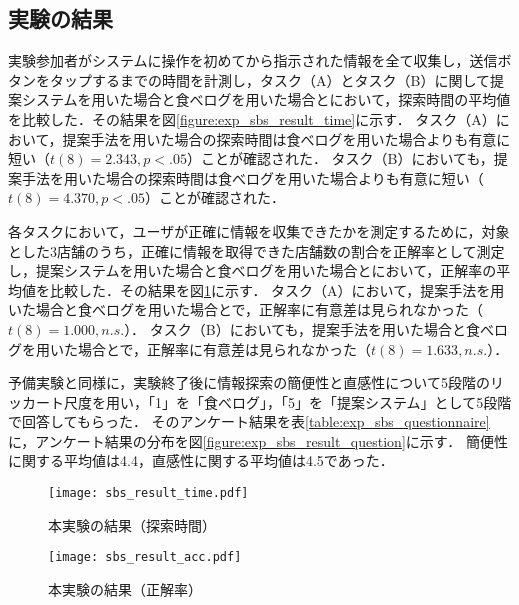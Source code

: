   \subsection{実験の結果}
    実験参加者がシステムに操作を初めてから指示された情報を全て収集し，送信ボタンをタップするまでの時間を計測し，タスク（A）とタスク（B）に関して提案システムを用いた場合と食べログを用いた場合とにおいて，探索時間の平均値を比較した．その結果を図\ref{figure:exp_sbs_result_time}に示す．
    タスク（A）において，提案手法を用いた場合の探索時間は食べログを用いた場合よりも有意に短い（$t(8)=2.343, p<.05$）ことが確認された．
    タスク（B）においても，提案手法を用いた場合の探索時間は食べログを用いた場合よりも有意に短い（$t(8)=4.370, p<.05$）ことが確認された．

    各タスクにおいて，ユーザが正確に情報を収集できたかを測定するために，対象とした3店舗のうち，正確に情報を取得できた店舗数の割合を正解率として測定し，提案システムを用いた場合と食べログを用いた場合とにおいて，正解率の平均値を比較した．その結果を図\ref{figure:exp_sbs_result_acc}に示す．
    タスク（A）において，提案手法を用いた場合と食べログを用いた場合とで，正解率に有意差は見られなかった（$t(8)=1.000, n.s.$）．
    タスク（B）においても，提案手法を用いた場合と食べログを用いた場合とで，正解率に有意差は見られなかった（$t(8)=1.633, n.s.$）．

    予備実験と同様に，実験終了後に情報探索の簡便性と直感性について5段階のリッカート尺度を用い，「1」を「食べログ」，「5」を「提案システム」として5段階で回答してもらった．
    そのアンケート結果を表\ref{table:exp_sbs_questionnaire}に，アンケート結果の分布を図\ref{figure:exp_sbs_result_question}に示す．
    簡便性に関する平均値は4.4，直感性に関する平均値は4.5であった．

    \begin{figure}[tb]
      \begin{center}
        \texttt{[image: sbs\_result\_time.pdf]}
        \caption{本実験の結果（探索時間）}
        \label{figure:exp_sbs_result_time}
      \end{center}
      \vspace{1cm}
      \begin{center}
        \texttt{[image: sbs\_result\_acc.pdf]}
        \caption{本実験の結果（正解率）}
        \label{figure:exp_sbs_result_acc}
      \end{center}
    \end{figure}

